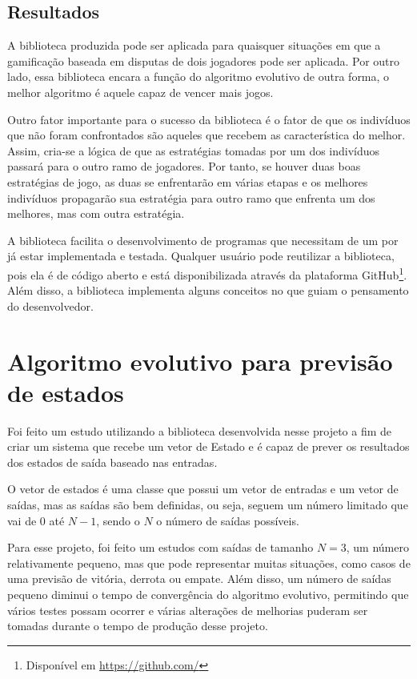 \subsection{Resultados}

A biblioteca produzida pode ser aplicada para quaisquer situações em que a gamificação baseada em disputas de dois jogadores pode ser aplicada. Por outro lado, essa biblioteca encara a função \fitness do algoritmo evolutivo de outra forma, o melhor algoritmo é aquele capaz de vencer mais jogos.

Outro fator importante para o sucesso da biblioteca é o fator de que os indivíduos que não foram confrontados são aqueles que recebem as característica do melhor. Assim, cria-se a lógica de que as estratégias tomadas por um dos indivíduos passará para o outro ramo de jogadores. Por tanto, se houver duas boas estratégias de jogo, as duas se enfrentarão em várias etapas e os melhores indivíduos propagarão sua estratégia para outro ramo que enfrenta um dos melhores, mas com outra estratégia.

A biblioteca facilita o desenvolvimento de programas que necessitam de um \SE por já estar implementada e testada. Qualquer usuário pode reutilizar a biblioteca, pois ela é de código aberto e está disponibilizada através da plataforma GitHub\footnote{Disponível em \url{https://github.com/}}. Além disso, a biblioteca implementa alguns conceitos no \SE que guiam o pensamento do desenvolvedor.

\section{Algoritmo evolutivo para previsão de estados}

Foi feito um estudo utilizando a biblioteca desenvolvida nesse projeto a fim de criar um sistema que recebe um vetor de Estado e é capaz de prever os resultados dos estados de saída baseado nas entradas.

O vetor de estados é uma classe que possui um vetor de entradas e um vetor de saídas, mas as saídas são bem definidas, ou seja, seguem um número limitado que vai de 0 até $N-1$, sendo o $N$ o número de saídas possíveis.

Para esse projeto, foi feito um estudos com saídas de tamanho $N=3$, um número relativamente pequeno, mas que pode representar muitas situações, como casos de uma previsão de vitória, derrota ou empate. Além disso, um número de saídas pequeno diminui o tempo de convergência do algoritmo evolutivo, permitindo que vários testes possam ocorrer e várias alterações de melhorias puderam ser tomadas durante o tempo de produção desse projeto.

